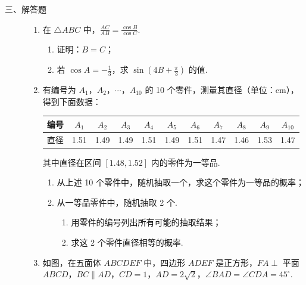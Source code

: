 \begin{description}

    \item[三、解答题]

    \begin{enumerate}[leftmargin=5pt]

      \addtocounter{enumi}{+16}

        \item 在 \(\triangle ABC\) 中，\(\frac{AC}{AB} = \frac{\cos B}{\cos C}\).

\begin{enumerate}
\item 证明：\(B = C\)；
\item 若 \(\cos A = -\frac{1}{3}\)，求 \(\sin \left(4B + \frac{\pi}{3}\right)\) 的值.
\end{enumerate}

        \item 有编号为 \(A_1\)，\(A_2\)，\(\cdots\)，\(A_{10}\) 的 10 个零件，测量其直径（单位：\(\mathrm{cm}\)），得到下面数据：

\begin{center}
\begin{tabular}{|c|*{10}{c|}}
\hline
编号 & \(A_1\) & \(A_2\) & \(A_3\) & \(A_4\) & \(A_5\) & \(A_6\) & \(A_7\) & \(A_8\) & \(A_9\) & \(A_{10}\) \\
\hline
直径 & 1.51 & 1.49 & 1.49 & 1.51 & 1.49 & 1.51 & 1.47 & 1.46 & 1.53 & 1.47 \\
\hline
\end{tabular}
\end{center}

其中直径在区间 \([1.48,1.52]\) 内的零件为一等品.

\begin{enumerate}
\item 从上述 10 个零件中，随机抽取一个，求这个零件为一等品的概率；
\item 从一等品零件中，随机抽取 2 个.

\begin{enumerate}
\item 用零件的编号列出所有可能的抽取结果；
\item 求这 2 个零件直径相等的概率.
\end{enumerate}
\end{enumerate}

        \item 如图，在五面体 \(ABCDEF\) 中，四边形 \(ADEF\) 是正方形，\(FA \perp\) 平面 \(ABCD\)，\(BC \parallel AD\)，\(CD = 1\)，\(AD = 2\sqrt{2}\)，\(\angle BAD = \angle CDA = 45^\circ\).


\end{enumerate}
\end{description}
